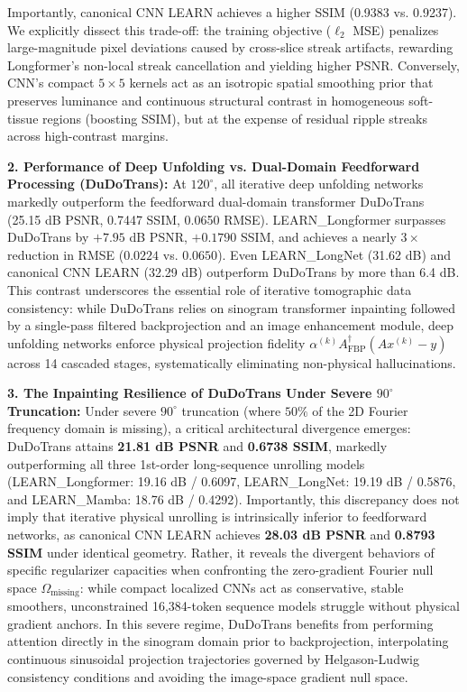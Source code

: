 \documentclass[runningheads]{llncs}
\begin{document}
Importantly, canonical CNN LEARN achieves a higher SSIM (0.9383 vs. 0.9237). We explicitly dissect this trade-off: the training objective ($\ell_2$ MSE) penalizes large-magnitude pixel deviations caused by cross-slice streak artifacts, rewarding Longformer's non-local streak cancellation and yielding higher PSNR. Conversely, CNN's compact $5 \times 5$ kernels act as an isotropic spatial smoothing prior that preserves luminance and continuous structural contrast in homogeneous soft-tissue regions (boosting SSIM), but at the expense of residual ripple streaks across high-contrast margins.

\noindent \textbf{2. Performance of Deep Unfolding vs. Dual-Domain Feedforward Processing (DuDoTrans):}
At $120^\circ$, all iterative deep unfolding networks markedly outperform the feedforward dual-domain transformer DuDoTrans (25.15 dB PSNR, 0.7447 SSIM, 0.0650 RMSE). LEARN\_Longformer surpasses DuDoTrans by $+7.95$ dB PSNR, $+0.1790$ SSIM, and achieves a nearly $3\times$ reduction in RMSE ($0.0224$ vs. $0.0650$). Even LEARN\_LongNet (31.62 dB) and canonical CNN LEARN (32.29 dB) outperform DuDoTrans by more than 6.4 dB. This contrast underscores the essential role of iterative tomographic data consistency: while DuDoTrans relies on sinogram transformer inpainting followed by a single-pass filtered backprojection and an image enhancement module, deep unfolding networks enforce physical projection fidelity $\alpha^{(k)} A^\dagger_{\text{FBP}}(A x^{(k)} - y)$ across 14 cascaded stages, systematically eliminating non-physical hallucinations.

\noindent \textbf{3. The Inpainting Resilience of DuDoTrans Under Severe $90^\circ$ Truncation:}
Under severe $90^\circ$ truncation (where $50\%$ of the 2D Fourier frequency domain is missing), a critical architectural divergence emerges: DuDoTrans attains \textbf{21.81 dB PSNR} and \textbf{0.6738 SSIM}, markedly outperforming all three 1st-order long-sequence unrolling models (LEARN\_Longformer: 19.16 dB / 0.6097, LEARN\_LongNet: 19.19 dB / 0.5876, and LEARN\_Mamba: 18.76 dB / 0.4292). Importantly, this discrepancy does not imply that iterative physical unrolling is intrinsically inferior to feedforward networks, as canonical CNN LEARN achieves \textbf{28.03 dB PSNR} and \textbf{0.8793 SSIM} under identical geometry. Rather, it reveals the divergent behaviors of specific regularizer capacities when confronting the zero-gradient Fourier null space $\Omega_{\text{missing}}$: while compact localized CNNs act as conservative, stable smoothers, unconstrained 16,384-token sequence models struggle without physical gradient anchors. In this severe regime, DuDoTrans benefits from performing attention directly in the sinogram domain prior to backprojection, interpolating continuous sinusoidal projection trajectories governed by Helgason-Ludwig consistency conditions \cite{kak2001principles} and avoiding the image-space gradient null space.
\end{document}
